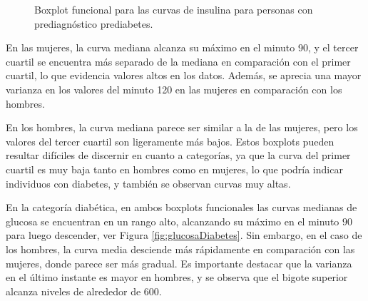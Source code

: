 \begin{figure}[H]
 \centering
    \caption{Boxplot funcional para las curvas de insulina para personas con prediagnóstico prediabetes.}
    \label{fig:insulinaPredia}
\end{figure}

En las mujeres, la curva mediana alcanza su máximo en el minuto 90, y el tercer cuartil se encuentra más separado de la mediana en comparación con el primer cuartil, lo que evidencia valores altos en los datos. Además, se aprecia una mayor varianza en los valores del minuto 120 en las mujeres en comparación con los hombres.


En los hombres, la curva mediana parece ser similar a la de las mujeres, pero los valores del tercer cuartil son ligeramente más bajos. Estos boxplots pueden resultar difíciles de discernir en cuanto a categorías, ya que la curva del primer cuartil es muy baja tanto en hombres como en mujeres, lo que podría indicar individuos con diabetes, y también se observan curvas muy altas.



En la categoría diabética, en ambos boxplots funcionales las curvas medianas de glucosa se encuentran en un rango alto, alcanzando su máximo en el minuto $90$ para luego descender, ver Figura \ref{fig:glucosaDiabetes}. Sin embargo, en el caso de los hombres, la curva media desciende más rápidamente en comparación con las mujeres, donde parece ser más gradual. Es importante destacar que la varianza en el último instante es mayor en hombres, y se observa que el bigote superior alcanza niveles de alrededor de $600$.

